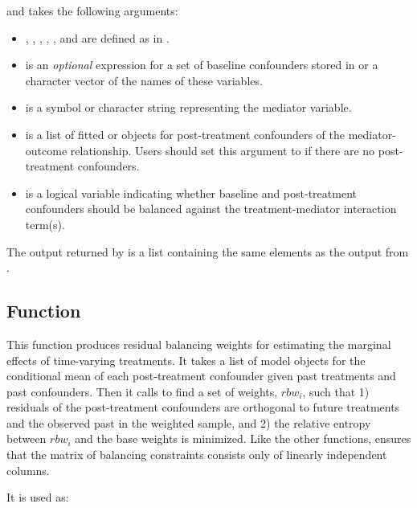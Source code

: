 and takes the following arguments:

\begin{itemize}
\tightlist
\item
  , , , ,
  , and  are defined as in
  .
\item
   is an \emph{optional} expression for a set of
  baseline confounders stored in  or a character vector of
  the names of these variables.
\item
   is a symbol or character string representing the
  mediator variable.
\item
   is a list of fitted  or  objects for
  post-treatment confounders of the mediator-outcome relationship. Users
  should set this argument to  if there are no post-treatment
  confounders.
\item
   is a logical variable indicating whether baseline and
  post-treatment confounders should be balanced against the
  treatment-mediator interaction term(s).
\end{itemize}

The output returned by  is a list containing the same
elements as the output from .

\hypertarget{rbwPanel}{%
\subsection{\texorpdfstring{Function
}{Function }}\label{rbwPanel}}

This function produces residual balancing weights for estimating the
marginal effects of time-varying treatments. It takes a list of model
objects for the conditional mean of each post-treatment confounder given
past treatments and past confounders. Then it calls  to find
a set of weights, \(rbw_{i}\), such that 1) residuals of the
post-treatment confounders are orthogonal to future treatments and the
observed past in the weighted sample, and 2) the relative entropy
between \(rbw_{i}\) and the base weights is minimized. Like the other
functions,  ensures that the matrix of balancing
constraints consists only of linearly independent columns.

It is used as:

\\
\hspace*{0.333em}\hspace*{0.333em}\hspace*{0.333em}\hspace*{0.333em}\hspace*{0.333em}\hspace*{0.333em}\hspace*{0.333em}\hspace*{0.333em}\hspace*{0.333em}\hspace*{0.333em}\hspace*{0.333em}

